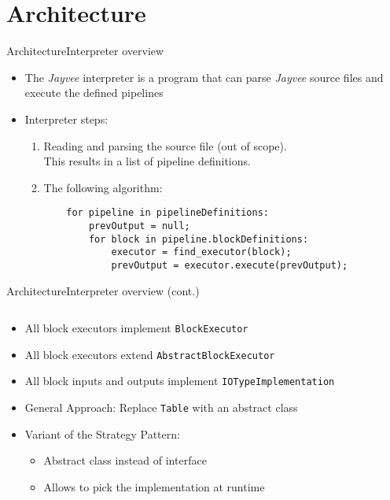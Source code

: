 \section{Architecture}
\begin{frame}[t,fragile]{Architecture}{Interpreter overview}
	\begin{itemize}
		\item The \emph{Jayvee} interpreter is a program that can parse \emph{Jayvee} source files and execute the defined pipelines
		      \pause
		\item Interpreter steps:
		      \begin{enumerate}
			      \item Reading and parsing the source file (out of scope). \\
			            This results in a list of pipeline definitions.
			            \pause
			      \item The following algorithm:
			            \begin{verbatim}
	for pipeline in pipelineDefinitions:
		prevOutput = null;
		for block in pipeline.blockDefinitions:
			executor = find_executor(block);
			prevOutput = executor.execute(prevOutput);
					\end{verbatim}
		      \end{enumerate}
	\end{itemize}
\end{frame}
\begin{frame}[t]{Architecture}{Interpreter overview (cont.)}
	\begin{columns}[t]
		\begin{column}{0.4\linewidth}
			\begin{itemize}
				\item<1-> All block executors implement \Verb|BlockExecutor|
				\item<2-> All block executors extend \Verb|AbstractBlockExecutor|
				\item<3-> All block inputs and outputs implement \Verb|IOTypeImplementation|
				\item<4-> General Approach: Replace \Verb|Table| with an abstract class
				\item<6-> Variant of the Strategy Pattern\footnotemark:
				      \begin{itemize}[<6->]
					      \item Abstract class instead of interface
					      \item Allows to pick the implementation at runtime
				      \end{itemize}
			\end{itemize}
		\end{column}
		\hfill
		\begin{column}{0.5\linewidth}
			\begin{center}
				\footnotesize
				 {
					
				}
				\only<5-> {
					
				}
			\end{center}
		\end{column}
	\end{columns}
\end{frame}

